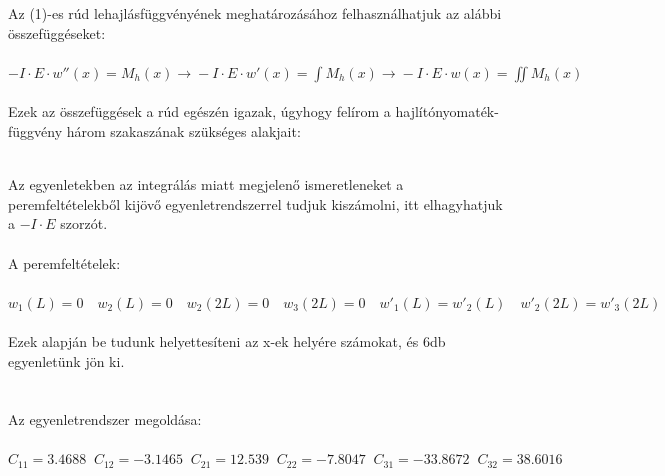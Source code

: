 \documentclass[10pt, a4paper]{article}
\begin{document}
	Az (1)-es rúd lehajlásfüggvényének meghatározásához felhasználhatjuk az alábbi összefüggéseket:\\\\
	$-I \cdot E \cdot w''(x) = M_h(x) \xrightarrow{} -I \cdot E \cdot w'(x) = \int M_h(x) \xrightarrow{} -I \cdot E \cdot w(x) = \iint M_h(x)$\\\\
	Ezek az összefüggések a rúd egészén igazak, úgyhogy felírom a hajlítónyomaték-függvény három szakaszának szükséges alakjait:
		\begin{table}[h]
		\renewcommand{\arraystretch}{1.8}
	\end{table}\\
	Az egyenletekben az integrálás miatt megjelenő ismeretleneket a peremfeltételekből kijövő egyenletrendszerrel tudjuk kiszámolni, itt elhagyhatjuk a $-I \cdot E$ szorzót.\\\\
	A peremfeltételek:\\\\
	$w_1(L) = 0 \quad w_2(L) = 0 \quad w_2(2L) = 0 \quad w_3(2L) = 0 \quad w'_1(L) = w'_2(L) \quad w'_2(2L) = w'_3(2L)$\\\\
	Ezek alapján be tudunk helyettesíteni az x-ek helyére számokat, és 6db egyenletünk jön ki.\\\\\\
	Az egyenletrendszer megoldása:\\\\
	$C_{11} = 3.4688 \;\; C_{12} = -3.1465 \;\; C_{21} = 12.539 \;\; C_{22} = -7.8047 \;\; C_{31} = -33.8672 \;\; C_{32} = 38.6016$\\\\
\end{document}
